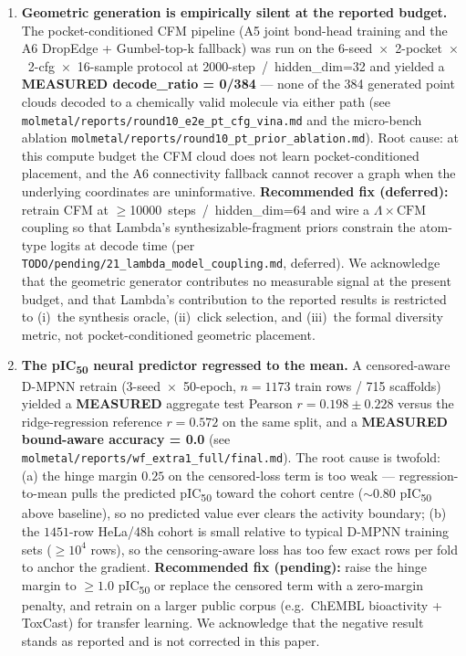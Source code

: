 \begin{enumerate}
  \item \textbf{Geometric generation is empirically silent at the reported budget.}
  The pocket-conditioned CFM pipeline (A5 joint bond-head training and
  the A6 DropEdge + Gumbel-top-k fallback) was run on the
  \mbox{6-seed $\times$ 2-pocket $\times$ 2-cfg $\times$ 16-sample} protocol
  at \mbox{2000-step / hidden\_dim=32} and yielded a
  \textbf{MEASURED decode\_ratio = 0/384} --- none of the 384 generated
  point clouds decoded to a chemically valid molecule via either path
  (see \texttt{molmetal/reports/round10\_e2e\_pt\_cfg\_vina.md} and the
  micro-bench ablation \texttt{molmetal/reports/round10\_pt\_prior\_ablation.md}).
  Root cause: at this compute budget the CFM cloud does not learn
  pocket-conditioned placement, and the A6 connectivity fallback cannot
  recover a graph when the underlying coordinates are uninformative.
  \textbf{Recommended fix (deferred):} retrain CFM at
  \mbox{$\geq$10000 steps / hidden\_dim=64} and wire a $\Lambda \times
  \mathrm{CFM}$ coupling so that Lambda's synthesizable-fragment priors
  constrain the atom-type logits at decode time (per
  \texttt{TODO/pending/21\_lambda\_model\_coupling.md}, deferred).
  We acknowledge that the geometric generator contributes no measurable
  signal at the present budget, and that Lambda's contribution to the
  reported results is restricted to (i)~the synthesis oracle,
  (ii)~click selection, and (iii)~the formal diversity metric, not
  pocket-conditioned geometric placement.

  \item \textbf{The pIC\textsubscript{50} neural predictor regressed to the mean.}
  A censored-aware D-MPNN retrain (\mbox{3-seed $\times$ 50-epoch},
  $n=1173$ train rows / 715 scaffolds) yielded a \textbf{MEASURED}
  aggregate test Pearson $r = 0.198 \pm 0.228$ versus the ridge-regression
  reference $r = 0.572$ on the same split, and a
  \textbf{MEASURED bound-aware accuracy = 0.0} (see
  \texttt{molmetal/reports/wf\_extra1\_full/final.md}). The root cause is
  twofold: (a) the hinge margin $0.25$ on the censored-loss term is too
  weak --- regression-to-mean pulls the predicted pIC\textsubscript{50}
  toward the cohort centre ($\sim 0.80$ pIC\textsubscript{50} above
  baseline), so no predicted value ever clears the activity boundary;
  (b) the $1451$-row HeLa/48h cohort is small relative to typical
  D-MPNN training sets ($\geq 10^4$ rows), so the censoring-aware loss
  has too few exact rows per fold to anchor the gradient. \textbf{Recommended
  fix (pending):} raise the hinge margin to $\geq 1.0$ pIC\textsubscript{50}
  or replace the censored term with a zero-margin penalty, and retrain
  on a larger public corpus (e.g.\ ChEMBL bioactivity + ToxCast) for
  transfer learning. We acknowledge that the negative result stands as
  reported and is not corrected in this paper.


\end{enumerate}
